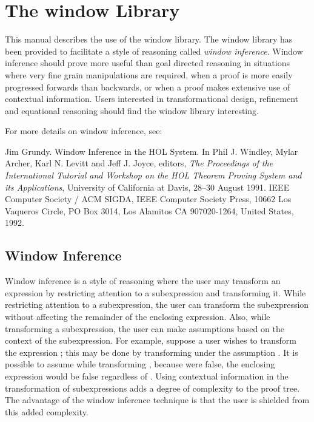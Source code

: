 \chapter{The window Library}

This manual describes the use of the window library.
The window library has been provided to facilitate a style of 
reasoning called {\it window inference}.
Window inference should prove more useful than goal directed reasoning in
situations where
very fine grain manipulations are required,
when a proof is more easily progressed forwards than backwards,
or when a proof makes extensive use of contextual information.
Users interested in transformational design, refinement and equational 
reasoning should find the window library interesting.

For more details on window inference, see:
\begin{center}
	\begin{minipage}{0.8\columnwidth}
		\small
		\noindent
		Jim Grundy.
		Window Inference in the HOL System.
		In Phil J. Windley, Mylar Archer, Karl N. Levitt and
		Jeff J. Joyce, editors,
		{\it The Proceedings of the International Tutorial and Workshop on
		the HOL Theorem Proving System and its Applications},
		University of California at Davis, 28--30 August 1991.
		IEEE Computer Society / ACM SIGDA, IEEE Computer Society Press,
		10662 Los Vaqueros Circle, PO Box 3014,
		Los Alamitos CA 907020-1264, United States, 1992.
	\end{minipage}
\end{center}

\section{Window Inference}

Window inference is a style of reasoning where the user may transform an
expression by restricting attention to a subexpression and transforming it.
While restricting attention to a subexpression, the user can transform the
subexpression without affecting the remainder of the enclosing expression.
Also, while transforming a subexpression, the user can make assumptions based
on the context of the subexpression.
For example, suppose a user wishes to transform the expression
;
this may be done by transforming  under the assumption .
It is possible to assume  while transforming ,
because were  false,
the enclosing expression  would be false regardless of
.
Using contextual information in the transformation of subexpressions adds a
degree of complexity to the proof tree.
The advantage of the window inference technique is that the user is shielded
from this added complexity.

